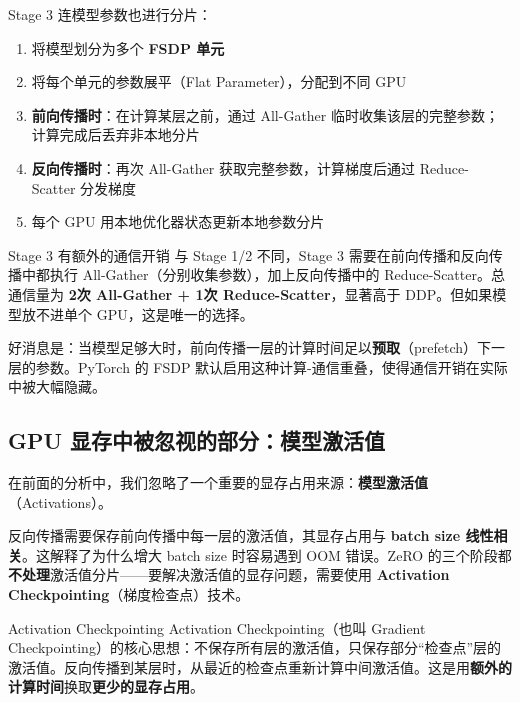 \documentclass[a4paper]{article}
\begin{document}



Stage 3 连模型参数也进行分片：
\begin{enumerate}
    \item 将模型划分为多个 \textbf{FSDP 单元}
    \item 将每个单元的参数展平（Flat Parameter），分配到不同 GPU
    \item \textbf{前向传播时}：在计算某层之前，通过 All-Gather 临时收集该层的完整参数；计算完成后丢弃非本地分片
    \item \textbf{反向传播时}：再次 All-Gather 获取完整参数，计算梯度后通过 Reduce-Scatter 分发梯度
    \item 每个 GPU 用本地优化器状态更新本地参数分片
\end{enumerate}





\begin{warningbox}{Stage 3 有额外的通信开销}
与 Stage 1/2 不同，Stage 3 需要在前向传播和反向传播中都执行 All-Gather（分别收集参数），加上反向传播中的 Reduce-Scatter。总通信量为 \textbf{2次 All-Gather + 1次 Reduce-Scatter}，显著高于 DDP。但如果模型放不进单个 GPU，这是唯一的选择。
\end{warningbox}





好消息是：当模型足够大时，前向传播一层的计算时间足以\textbf{预取}（prefetch）下一层的参数。PyTorch 的 FSDP 默认启用这种计算-通信重叠，使得通信开销在实际中被大幅隐藏。

\subsection{GPU 显存中被忽视的部分：模型激活值}

在前面的分析中，我们忽略了一个重要的显存占用来源：\textbf{模型激活值}（Activations）。





反向传播需要保存前向传播中每一层的激活值，其显存占用与 \textbf{batch size 线性相关}。这解释了为什么增大 batch size 时容易遇到 OOM 错误。ZeRO 的三个阶段都\textbf{不处理}激活值分片——要解决激活值的显存问题，需要使用 \textbf{Activation Checkpointing}（梯度检查点）技术。

\begin{knowledgebox}{Activation Checkpointing}
Activation Checkpointing（也叫 Gradient Checkpointing）的核心思想：不保存所有层的激活值，只保存部分``检查点''层的激活值。反向传播到某层时，从最近的检查点重新计算中间激活值。这是用\textbf{额外的计算时间}换取\textbf{更少的显存占用}。
\end{knowledgebox}
\end{document}
